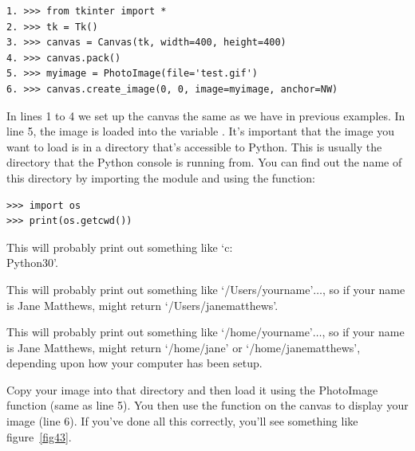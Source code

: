 \begin{Verbatim}[frame=single]
1. >>> from tkinter import *
2. >>> tk = Tk()
3. >>> canvas = Canvas(tk, width=400, height=400)
4. >>> canvas.pack()
5. >>> myimage = PhotoImage(file='test.gif')
6. >>> canvas.create_image(0, 0, image=myimage, anchor=NW)
\end{Verbatim}

In lines 1 to 4 we set up the canvas the same as we have in previous examples. In line 5, the image is loaded into the variable . It's important that the image you want to load is in a directory that's accessible to Python. This is usually the directory that the Python console is running from. You can find out the name of this directory by importing the  module and using the  function:

\begin{Verbatim}[frame=single]
>>> import os
>>> print(os.getcwd())
\end{Verbatim}

\begin{WINDOWS}
This will probably print out something like `c:\\Python30'.
\end{WINDOWS}

\begin{MAC}
This will probably print out something like `/Users/yourname'$\ldots$, so if your name is Jane Matthews,  might return `/Users/janematthews'.
\end{MAC}

\begin{LINUX}
This will probably print out something like `/home/yourname'$\ldots$, so if your name is Jane Matthews,  might return `/home/jane' or `/home/janematthews', depending upon how your computer has been setup.
\end{LINUX}

Copy your image into that directory and then load it using the PhotoImage function (same as line 5). You then use the  function on the canvas to display your image (line 6). If you've done all this correctly, you'll see something like figure~\ref{fig43}.

